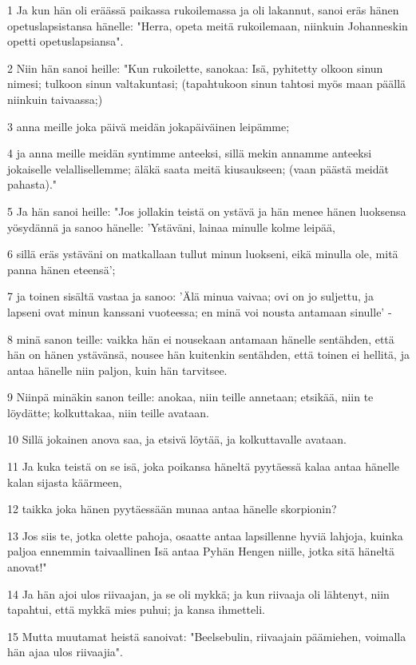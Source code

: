 \par 1 Ja kun hän oli eräässä paikassa rukoilemassa ja oli lakannut, sanoi eräs hänen opetuslapsistansa hänelle: "Herra, opeta meitä rukoilemaan, niinkuin Johanneskin opetti opetuslapsiansa".
\par 2 Niin hän sanoi heille: "Kun rukoilette, sanokaa: Isä, pyhitetty olkoon sinun nimesi; tulkoon sinun valtakuntasi; (tapahtukoon sinun tahtosi myös maan päällä niinkuin taivaassa;)
\par 3 anna meille joka päivä meidän jokapäiväinen leipämme;
\par 4 ja anna meille meidän syntimme anteeksi, sillä mekin annamme anteeksi jokaiselle velallisellemme; äläkä saata meitä kiusaukseen; (vaan päästä meidät pahasta)."
\par 5 Ja hän sanoi heille: "Jos jollakin teistä on ystävä ja hän menee hänen luoksensa yösydännä ja sanoo hänelle: 'Ystäväni, lainaa minulle kolme leipää,
\par 6 sillä eräs ystäväni on matkallaan tullut minun luokseni, eikä minulla ole, mitä panna hänen eteensä';
\par 7 ja toinen sisältä vastaa ja sanoo: 'Älä minua vaivaa; ovi on jo suljettu, ja lapseni ovat minun kanssani vuoteessa; en minä voi nousta antamaan sinulle' -
\par 8 minä sanon teille: vaikka hän ei nousekaan antamaan hänelle sentähden, että hän on hänen ystävänsä, nousee hän kuitenkin sentähden, että toinen ei hellitä, ja antaa hänelle niin paljon, kuin hän tarvitsee.
\par 9 Niinpä minäkin sanon teille: anokaa, niin teille annetaan; etsikää, niin te löydätte; kolkuttakaa, niin teille avataan.
\par 10 Sillä jokainen anova saa, ja etsivä löytää, ja kolkuttavalle avataan.
\par 11 Ja kuka teistä on se isä, joka poikansa häneltä pyytäessä kalaa antaa hänelle kalan sijasta käärmeen,
\par 12 taikka joka hänen pyytäessään munaa antaa hänelle skorpionin?
\par 13 Jos siis te, jotka olette pahoja, osaatte antaa lapsillenne hyviä lahjoja, kuinka paljoa ennemmin taivaallinen Isä antaa Pyhän Hengen niille, jotka sitä häneltä anovat!"
\par 14 Ja hän ajoi ulos riivaajan, ja se oli mykkä; ja kun riivaaja oli lähtenyt, niin tapahtui, että mykkä mies puhui; ja kansa ihmetteli.
\par 15 Mutta muutamat heistä sanoivat: "Beelsebulin, riivaajain päämiehen, voimalla hän ajaa ulos riivaajia".
